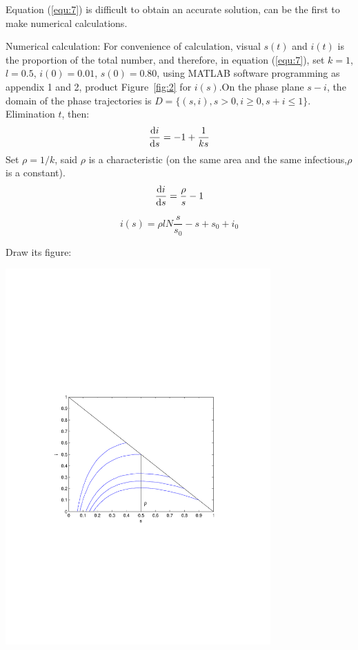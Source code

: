 Equation (\ref{equ:7}) is difficult to obtain an accurate
solution, can be the first to make numerical calculations.
\par Numerical calculation: For convenience of calculation, visual
$ s(t) $ and $ i(t) $ is the proportion of the total number,
and therefore, in equation (\ref{equ:7}), set $k=1$,
$l=0.5$, $i(0)=0.01$, $s(0)=0.80$, using MATLAB software
programming as appendix 1 and 2, product Figure~\ref{fig:2} for
$i(s)$.On the phase plane $s-i$, the domain of the phase
trajectories is $ D=\{(s,i),s>0,i\geq 0,s+i\leq1\} $.\\
Elimination $ t $, then:
\begin{equation}
\frac{{\mathrm{d}}i}{{\mathrm{d}}s}=-1+\frac{1}{ks}
\label{equ:8}
\end{equation}
Set $\rho=1/k$, said $\rho$ is a characteristic (on the
same area and the same infectious,$\rho$ is a
constant)\cite{bib2}.
\begin{equation}
\frac{{\mathrm{d}}i}{{\mathrm{d}}s}=\frac{\rho}{s}-1
\label{equ:9}
\end{equation}

\begin{equation}
i(s)=\rho lN\frac{s}{s_0}-s+s_0+i_0
\label{equ:10}
\end{equation}

Draw its figure:\par
\begin{center}
\includegraphics[width=4in]{imgs/i(s)_i_s.pdf}
\end{center}

